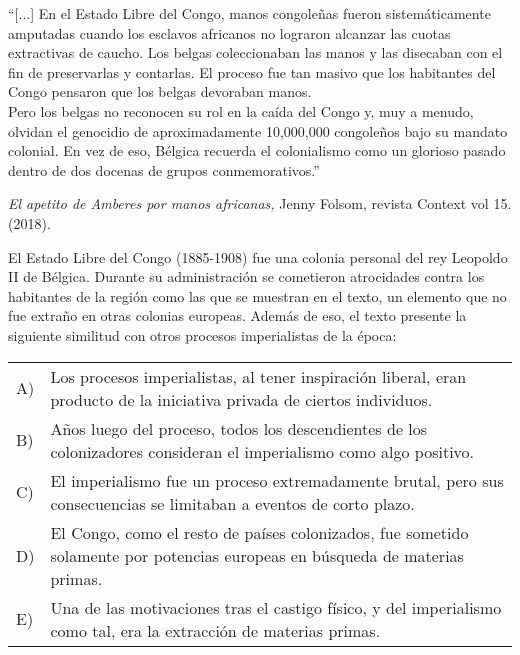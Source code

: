 \documentclass[letterpaper,11pt]{article}
\newcommand{\anchopregunta}{0.9\textwidth}
\begin{document}
\begin{enumerate}
\begin{minipage}{\anchopregunta}
\item ``[...] En el Estado Libre del Congo, manos congoleñas fueron sistemáticamente amputadas cuando los esclavos africanos no lograron alcanzar las cuotas extractivas de caucho. Los belgas coleccionaban las manos y las disecaban con el fin de preservarlas y contarlas. El proceso fue tan masivo que los habitantes del Congo pensaron que los belgas devoraban manos.\\
Pero los belgas no reconocen su rol en la caída del Congo y, muy a menudo, olvidan el genocidio de aproximadamente 10,000,000 congoleños bajo su mandato colonial. En vez de eso, Bélgica recuerda el colonialismo como un glorioso pasado dentro de dos docenas de grupos conmemorativos.''\\
\begin{flushright}
\textit{El apetito de Amberes por manos africanas,} Jenny Folsom, revista Context vol 15. (2018).
\end{flushright}
El Estado Libre del Congo (1885-1908) fue una colonia personal del rey Leopoldo II de Bélgica. Durante su administración se cometieron atrocidades contra los habitantes de la región como las que se muestran en el texto, un elemento que no fue extraño en otras colonias europeas. Además de eso, el texto presente la siguiente similitud con otros procesos imperialistas de la época:
\begin{flushleft}\begin{tabular}{@{\hspace{-.001\textwidth}}l@{\hspace{2pt}}p{}}
A)& Los procesos imperialistas, al tener inspiración liberal, eran producto de la iniciativa privada de ciertos individuos.\\
B)& Años luego del proceso, todos los descendientes de los colonizadores consideran el imperialismo como algo positivo.\\
C)& El imperialismo fue un proceso extremadamente brutal, pero sus consecuencias se limitaban a eventos de corto plazo.\\
D)& El Congo, como el resto de países colonizados, fue sometido solamente por potencias europeas en búsqueda de materias primas.\\
E)& Una de las motivaciones tras el castigo físico, y del imperialismo como tal, era la extracción de materias primas.\\ 
\end{tabular}\end{flushleft}%

\end{minipage}
\end{enumerate}
\end{document}
